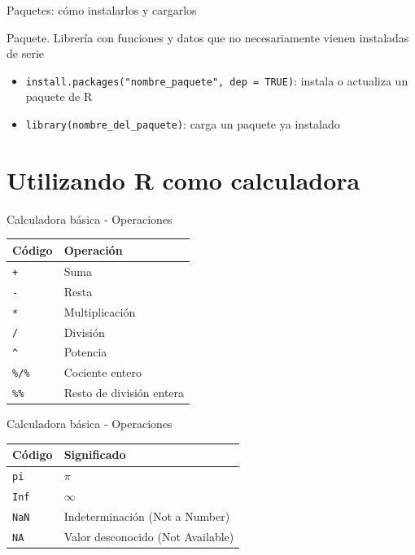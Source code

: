 \documentclass[
  ignorenonframetext,
]{beamer}
\providecommand{\tightlist}{%
  \setlength{\itemsep}{0pt}\setlength{\parskip}{0pt}}
\begin{document}
\begin{frame}[fragile]{Paquetes: cómo instalarlos y cargarlos}
\protect\hypertarget{paquetes-cuxf3mo-instalarlos-y-cargarlos}{}

Paquete. Librería con funciones y datos que no necesariamente vienen
instaladas de serie

\begin{itemize}
\tightlist
\item
  \texttt{install.packages("nombre\_paquete",\ dep\ =\ TRUE)}: instala o
  actualiza un paquete de R
\item
  \texttt{library(nombre\_del\_paquete)}: carga un paquete ya instalado
\end{itemize}

\end{frame}

\hypertarget{utilizando-r-como-calculadora}{%
\section{Utilizando R como
calculadora}\label{utilizando-r-como-calculadora}}

\begin{frame}[fragile]{Calculadora básica - Operaciones}
\protect\hypertarget{calculadora-buxe1sica---operaciones}{}

\begin{longtable}[]{@{}ll@{}}
\toprule
Código & Operación\tabularnewline
\midrule
\endhead
\texttt{+} & Suma\tabularnewline
\texttt{-} & Resta\tabularnewline
\texttt{*} & Multiplicación\tabularnewline
\texttt{/} & División\tabularnewline
\texttt{\^{}} & Potencia\tabularnewline
\texttt{\%/\%} & Cociente entero\tabularnewline
\texttt{\%\%} & Resto de división entera\tabularnewline
\bottomrule
\end{longtable}

\end{frame}

\begin{frame}[fragile]{Calculadora básica - Operaciones}
\protect\hypertarget{calculadora-buxe1sica---operaciones-1}{}

\begin{longtable}[]{@{}ll@{}}
\toprule
Código & Significado\tabularnewline
\midrule
\endhead
\texttt{pi} &
\href{https://es.wikipedia.org/wiki/Número_π}{\(\pi\)}\tabularnewline
\texttt{Inf} &
\href{https://es.wikipedia.org/wiki/Infinito}{\(\infty\)}\tabularnewline
\texttt{NaN} & Indeterminación (Not a Number)\tabularnewline
\texttt{NA} & Valor desconocido (Not Available)\tabularnewline
\bottomrule
\end{longtable}

\end{frame}
\end{document}
